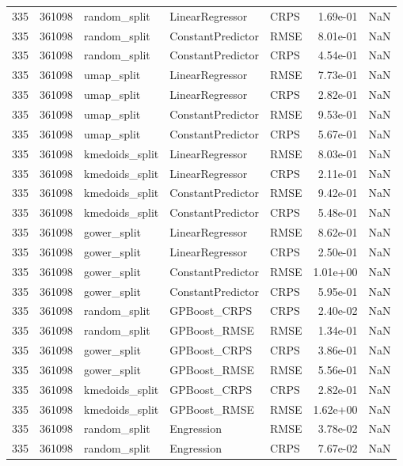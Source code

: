 \begin{tabular}{rrlllrr}
335 & 361098 & random\_split & LinearRegressor & CRPS & 1.69e-01 & NaN \\
335 & 361098 & random\_split & ConstantPredictor & RMSE & 8.01e-01 & NaN \\
335 & 361098 & random\_split & ConstantPredictor & CRPS & 4.54e-01 & NaN \\
335 & 361098 & umap\_split & LinearRegressor & RMSE & 7.73e-01 & NaN \\
335 & 361098 & umap\_split & LinearRegressor & CRPS & 2.82e-01 & NaN \\
335 & 361098 & umap\_split & ConstantPredictor & RMSE & 9.53e-01 & NaN \\
335 & 361098 & umap\_split & ConstantPredictor & CRPS & 5.67e-01 & NaN \\
335 & 361098 & kmedoids\_split & LinearRegressor & RMSE & 8.03e-01 & NaN \\
335 & 361098 & kmedoids\_split & LinearRegressor & CRPS & 2.11e-01 & NaN \\
335 & 361098 & kmedoids\_split & ConstantPredictor & RMSE & 9.42e-01 & NaN \\
335 & 361098 & kmedoids\_split & ConstantPredictor & CRPS & 5.48e-01 & NaN \\
335 & 361098 & gower\_split & LinearRegressor & RMSE & 8.62e-01 & NaN \\
335 & 361098 & gower\_split & LinearRegressor & CRPS & 2.50e-01 & NaN \\
335 & 361098 & gower\_split & ConstantPredictor & RMSE & 1.01e+00 & NaN \\
335 & 361098 & gower\_split & ConstantPredictor & CRPS & 5.95e-01 & NaN \\
335 & 361098 & random\_split & GPBoost\_CRPS & CRPS & 2.40e-02 & NaN \\
335 & 361098 & random\_split & GPBoost\_RMSE & RMSE & 1.34e-01 & NaN \\
335 & 361098 & gower\_split & GPBoost\_CRPS & CRPS & 3.86e-01 & NaN \\
335 & 361098 & gower\_split & GPBoost\_RMSE & RMSE & 5.56e-01 & NaN \\
335 & 361098 & kmedoids\_split & GPBoost\_CRPS & CRPS & 2.82e-01 & NaN \\
335 & 361098 & kmedoids\_split & GPBoost\_RMSE & RMSE & 1.62e+00 & NaN \\
335 & 361098 & random\_split & Engression & RMSE & 3.78e-02 & NaN \\
335 & 361098 & random\_split & Engression & CRPS & 7.67e-02 & NaN \\

\end{tabular}
